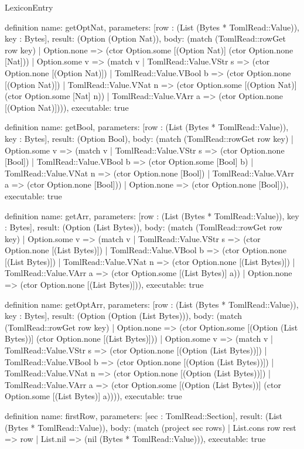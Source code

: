 \begin{lexlean}{LexiconEntry}
\begin{semanticmodule}
definition{
  name: getOptNat,
  parameters: [row : (List (Bytes * TomlRead::Value)), key : Bytes],
  result: (Option (Option Nat)),
  body: (match (TomlRead::rowGet row key)
    | Option.none => (ctor Option.some [(Option Nat)] (ctor Option.none [Nat]))
    | Option.some v => (match v
      | TomlRead::Value.VStr s => (ctor Option.none [(Option Nat)])
      | TomlRead::Value.VBool b => (ctor Option.none [(Option Nat)])
      | TomlRead::Value.VNat n => (ctor Option.some [(Option Nat)] (ctor Option.some [Nat] n))
      | TomlRead::Value.VArr a => (ctor Option.none [(Option Nat)]))),
  executable: true
}

definition{
  name: getBool,
  parameters: [row : (List (Bytes * TomlRead::Value)), key : Bytes],
  result: (Option Bool),
  body: (match (TomlRead::rowGet row key)
    | Option.some v => (match v
      | TomlRead::Value.VStr s => (ctor Option.none [Bool])
      | TomlRead::Value.VBool b => (ctor Option.some [Bool] b)
      | TomlRead::Value.VNat n => (ctor Option.none [Bool])
      | TomlRead::Value.VArr a => (ctor Option.none [Bool]))
    | Option.none => (ctor Option.none [Bool])),
  executable: true
}

definition{
  name: getArr,
  parameters: [row : (List (Bytes * TomlRead::Value)), key : Bytes],
  result: (Option (List Bytes)),
  body: (match (TomlRead::rowGet row key)
    | Option.some v => (match v
      | TomlRead::Value.VStr s => (ctor Option.none [(List Bytes)])
      | TomlRead::Value.VBool b => (ctor Option.none [(List Bytes)])
      | TomlRead::Value.VNat n => (ctor Option.none [(List Bytes)])
      | TomlRead::Value.VArr a => (ctor Option.some [(List Bytes)] a))
    | Option.none => (ctor Option.none [(List Bytes)])),
  executable: true
}

definition{
  name: getOptArr,
  parameters: [row : (List (Bytes * TomlRead::Value)), key : Bytes],
  result: (Option (Option (List Bytes))),
  body: (match (TomlRead::rowGet row key)
    | Option.none => (ctor Option.some [(Option (List Bytes))] (ctor Option.none [(List Bytes)]))
    | Option.some v => (match v
      | TomlRead::Value.VStr s => (ctor Option.none [(Option (List Bytes))])
      | TomlRead::Value.VBool b => (ctor Option.none [(Option (List Bytes))])
      | TomlRead::Value.VNat n => (ctor Option.none [(Option (List Bytes))])
      | TomlRead::Value.VArr a => (ctor Option.some [(Option (List Bytes))] (ctor Option.some [(List Bytes)] a)))),
  executable: true
}

definition{
  name: firstRow,
  parameters: [sec : TomlRead::Section],
  result: (List (Bytes * TomlRead::Value)),
  body: (match (project sec rows)
    | List.cons row rest => row
    | List.nil => (nil (Bytes * TomlRead::Value))),
  executable: true
}


\end{semanticmodule}
\end{lexlean}
